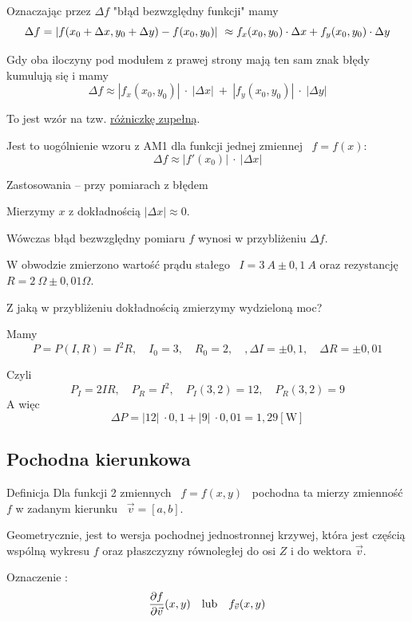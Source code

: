 Oznaczając przez $ \Delta f $ "błąd bezwzględny funkcji" mamy
\[ \Delta f  = | f(x_0 + \Delta x ,y_0 + \Delta y) - f(x_0, y_0) | \ \approx f_x(x_0, y_0) \cdot \Delta x + f_y(x_0, y_0) \cdot \Delta y \]

Gdy oba iloczyny pod modułem z prawej strony mają ten sam znak błędy kumulują się i mamy
\[ \Delta f \approx | f_x(x_0, y_0) | \ \cdot \ | \Delta x | \ + \ | f_y(x_0, y_0) | \ \cdot \ | \Delta y | \]

To jest wzór na tzw. \underline{różniczkę zupełną}.

Jest to uogólnienie wzoru z AM1 dla funkcji jednej zmiennej \ $ f = f(x) $:
\[ \Delta f \approx | f'(x_0) | \ \cdot \ | \Delta x | \]

Zastosowania -- przy pomiarach z błędem

Mierzymy $x$ z dokładnością $ | \Delta x| \approx 0 $.

Wówczas błąd bezwzględny pomiaru $f$ wynosi w przybliżeniu $ \Delta f $.

\begin{przyklad}
    W obwodzie zmierzono wartość prądu stałego \ $ I = 3 \ A \pm 0,1 \ A $ oraz rezystancję \ $ R = 2 \ \Omega \pm 0,01 \Omega $.

    Z jaką w przybliżeniu dokładnością zmierzymy wydzieloną moc? \bigskip

    Mamy
    \[ P = P(I, R) = I^2 R, \quad I_0 = 3, \quad R_0 = 2, \quad, \Delta I = \pm 0,1, \quad \Delta R = \pm 0,01 \]

    Czyli
    \[ P_I = 2 IR, \quad P_R = I^2, \quad P_I(3,2) = 12, \quad P_R(3,2) = 9 \]
    A więc
    \[ \Delta P = |12| \ \cdot 0,1 + |9| \ \cdot 0,01 = 1,29 [\textrm{W}] \]
\end{przyklad}


\subsection{Pochodna kierunkowa}

\begin{tw}{Definicja}
    Dla funkcji 2 zmiennych \ $ f = f(x,y) $ \ pochodna ta mierzy zmienność $f$ w zadanym kierunku \ $ \vec{v} = [a,b] $.

    Geometrycznie, jest to wersja pochodnej jednostronnej krzywej, która jest częścią wspólną wykresu $f$ oraz płaszczyzny równoległej
    do osi $Z$ i do wektora $\vec{v}$.

    Oznaczenie :
    \[ \frac{\partial f}{\partial \vec{v}}(x,y) \quad \text{lub} \quad f_{\vec{v}}(x,y) \]
\end{tw}

